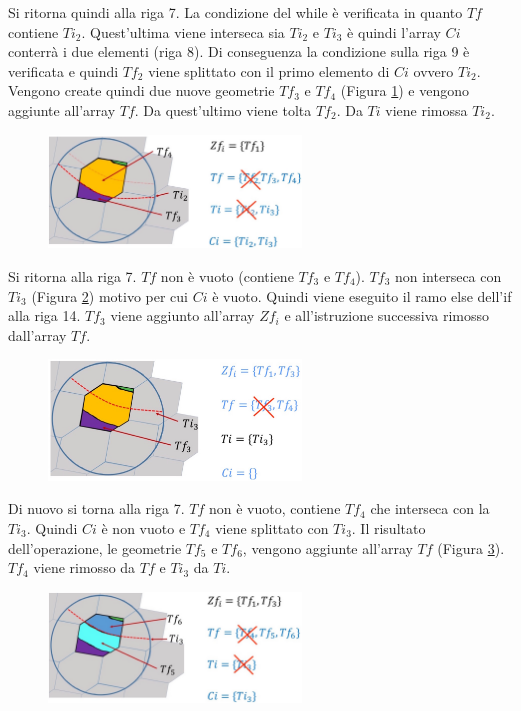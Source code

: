 Si ritorna quindi alla riga 7. La condizione del while è verificata in quanto  $Tf$ contiene $Ti_2$. Quest'ultima viene interseca sia $Ti_2$ e $Ti_3$ è quindi l'array $Ci$ conterrà i due elementi (riga 8). Di conseguenza la condizione sulla riga 9 è verificata e quindi $Tf_2$ viene splittato con il primo elemento di $Ci$ ovvero $Ti_2$. Vengono create quindi due nuove geometrie $Tf_3$ e $Tf_4$ (Figura \ref{pseudo4}) e vengono aggiunte all'array $Tf$. Da quest'ultimo viene tolta $Tf_2$. Da $Ti$ viene rimossa $Ti_2$.
	
\begin{figure}[h]
	\centering
	\includegraphics[width=0.6\textwidth]{images/pseudo4}
	\caption{}
	\label{pseudo4}
\end{figure}

Si ritorna alla riga 7. $Tf$ non è vuoto (contiene $Tf_3$ e $Tf_4$). $Tf_3$ non interseca con $Ti_3$ (Figura \ref{pseudo5}) motivo per cui $Ci$ è vuoto. Quindi viene eseguito il ramo else dell'if alla riga 14. $Tf_3$ viene aggiunto all'array $Zf_i$ e all'istruzione successiva rimosso dall'array $Tf$.
	
\begin{figure}[h]
	\centering
	\includegraphics[width=0.6\textwidth]{images/pseudo5}
	\caption{}
	\label{pseudo5}
\end{figure}

Di nuovo si torna alla riga 7. $Tf$ non è vuoto, contiene $Tf_4$ che interseca con la $Ti_3$. Quindi $Ci$ è non vuoto e $Tf_4$ viene splittato con $Ti_3$. Il risultato dell'operazione, le geometrie $Tf_5$ e $Tf_6$, vengono aggiunte all'array $Tf$ (Figura \ref{pseudo6}). $Tf_4$ viene rimosso da $Tf$ e $Ti_3$ da $Ti$. 

\begin{figure}[h]
	\centering
	\includegraphics[width=0.6\textwidth]{images/pseudo6}
	\caption{}
	\label{pseudo6}
\end{figure}

